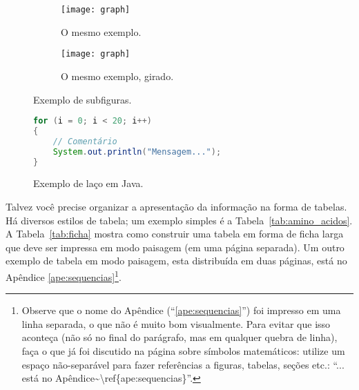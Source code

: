 \begin{figure}
  \centering
  \begin{subfigure}{0.4\textwidth}
    \texttt{[image: graph]}
    \caption{O mesmo exemplo.}
    \label{fig:subfigures:a}
  \end{subfigure}
  \begin{subfigure}{0.4\textwidth}
    \begin{turn}{90}
      \texttt{[image: graph]}
    \end{turn}
    \caption{O mesmo exemplo, girado.}
    \label{fig:subfigures:b}
  \end{subfigure}
  \caption{Exemplo de subfiguras.}
  \label{fig:subfigures}
\end{figure}


\begin{figure}
  \centering
\begin{lstlisting}[language=Java, style=wider]
for (i = 0; i < 20; i++)
{
	// Comentário
	System.out.println("Mensagem...");
}
\end{lstlisting}
  \caption{Exemplo de laço em Java.}
  \label{fig:java}
\end{figure}

Talvez você precise organizar a apresentação da informação na forma de
tabelas. Há diversos estilos de tabela; um exemplo simples é a
Tabela~\ref{tab:amino_acidos}. A Tabela~\ref{tab:ficha} mostra como construir
uma tabela em forma de ficha larga que deve ser impressa em modo paisagem (em
uma página separada). Um outro exemplo de tabela em modo paisagem, esta
distribuída em duas páginas, está no Apêndice \ref{ape:sequencias}\footnote{
Observe que o nome do Apêndice (``\ref{ape:sequencias}'') foi impresso em uma
linha separada, o que não é muito bom visualmente. Para evitar que isso
aconteça (não só no final do parágrafo, mas em qualquer quebra de linha),
faça o que já foi discutido na página \pageref{orphanchar} sobre símbolos
matemáticos: utilize um espaço não-separável para fazer referências a figuras,
tabelas, seções etc.: ``\textsf{... está no
Apêndice\textasciitilde\textbackslash{}ref\{ape:sequencias\}}''.}.


